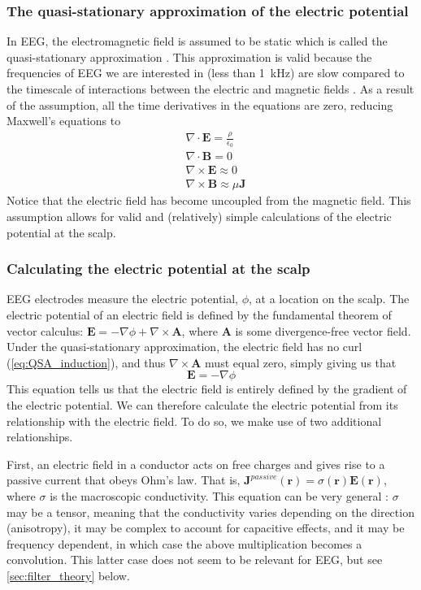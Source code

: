 \subsubsection{The quasi-stationary approximation of the electric potential}
In EEG, the electromagnetic field is assumed to be static which is called the quasi-stationary approximation \cite{Plonsey1967}. This approximation is valid because the frequencies of EEG we are interested in (less than \qty{1}{\kilo\hertz}) are slow compared to the timescale of interactions between the electric and magnetic fields \cite{RevModPhys.65.413}. As a result of the assumption, all the time derivatives in the equations are zero, reducing Maxwell's equations to
\begin{align}
    & \nabla \cdot \bm{E} = \frac{\rho}{\epsilon_0} \\
    & \nabla \cdot \bm{B} = 0 \\ 
    & \nabla \times \bm{E} \approx 0 \label{eq:QSA_induction} \\ 
    & \nabla \times \bm{B} \approx \mu \bm{J} \label{eq:QSA_amp_law}
\end{align}
Notice that the electric field has become uncoupled from the magnetic field. This assumption allows for valid and (relatively) simple calculations of the electric potential at the scalp.

\subsubsection{Calculating the electric potential at the scalp}
EEG electrodes measure the electric potential, $\phi$, at a location on the scalp. The electric potential of an electric field is defined by the fundamental theorem of vector calculus: $\bm{E} = - \nabla \phi + \nabla \times \bm{A}$, where $\bm{A}$ is some divergence-free vector field. Under the quasi-stationary approximation, the electric field has no curl (\ref{eq:QSA_induction}), and thus $\nabla \times \bm{A}$ must equal zero, simply giving us that 
\begin{equation} \label{eq:potential}
\bm{E} = -\nabla \phi
\end{equation}
This equation tells us that the electric field is entirely defined by the gradient of the electric potential. We can therefore calculate the electric potential from its relationship with the electric field. To do so, we make use of two additional relationships.

First, an electric field in a conductor acts on free charges and gives rise to a passive current that obeys Ohm's law. That is, $\bm{J}^{passive}(\bm{r}) = \sigma(\bm{r}) \bm{E}(\bm{r})$, where $\sigma$ is the macroscopic conductivity. This equation can be very general \cite{Pettersen2012}: $\sigma$ may be a tensor, meaning that the conductivity varies depending on the direction (anisotropy), it may be complex to account for capacitive effects, and it may be frequency dependent, in which case the above multiplication becomes a convolution. This latter case does not seem to be relevant for EEG, but see \autoref{sec:filter_theory} below.

